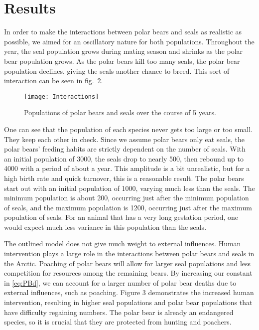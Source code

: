 \documentclass[reqno,11pt]{amsart}
\begin{document}
\section{Results}
\label{sec:results}
In order to make the interactions between polar bears and seals as realistic as possible, we aimed for an oscillatory nature for both populations. Throughout the year, the seal population grows during mating season and shrinks as the polar bear population grows. As the polar bears kill too many seals, the polar bear population declines, giving the seals another chance to breed. This sort of interaction can be seen in fig.~2.

\begin{figure}
\texttt{[image: Interactions]}
\vspace{-1.5em}
\caption{Populations of polar bears and seals over the course of 5 years.}
\end{figure}

One can see that the population of each species never gets too large or too small. They keep each other in check. Since we assume polar bears only eat seals, the polar bears’ feeding habits are strictly dependent on the number of seals. With an initial population of 3000, the seals drop to nearly 500, then rebound up to 4000 with a period of about a year. This amplitude is a bit unrealistic, but for a high birth rate and quick turnover, this is a reasonable result. The polar bears start out with an initial population of 1000, varying much less than the seals. The minimum population is about 200, occurring just after the minimum population of seals, and the maximum population is 1200, occurring just after the maximum population of seals. For an animal that has a very long gestation period, one would expect much less variance in this population than the seals.

The outlined model does not give much weight to external influences. Human intervention plays a large role in the interactions between polar bears and seals in the Arctic. Poaching of polar bears will allow for larger seal populations and less competition for resources among the remaining bears. By increasing our constant in \eqref{eq:PBd}, we can account for a larger number of polar bear deaths due to external influences, such as poaching. Figure 3 demonstrates the increased human intervention, resulting in higher seal populations and polar bear populations that have difficulty regaining numbers. The polar bear is already an endangered species, so it is crucial that they are protected from hunting and poachers. 
\end{document}
